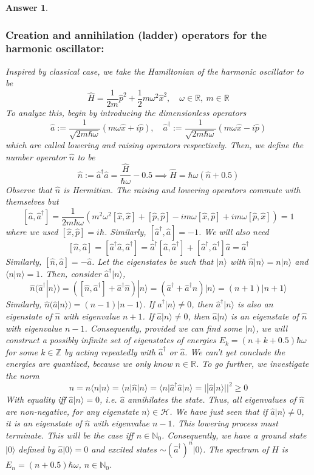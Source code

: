\documentclass[a4paper]{article}
\newtheorem{ans}{Answer}[subsection]
\theoremstyle{new}
\begin{document}
\begin{ans}
\subsubsection*{Creation and annihilation (ladder) operators for the harmonic oscillator:}
Inspired by classical case, we take the Hamiltonian of the harmonic oscillator to be
$$\hat{H}=\frac{1}{2m}\hat{p}^2+\frac{1}{2}m\omega^2\hat{x}^2,\quad \omega\in\mathbb{R},~m\in\mathbb{R}$$
To analyze this, begin by introducing the dimensionless operators
$$\hat{a}:=\frac{1}{\sqrt{2m\hbar\omega}}(m\omega\hat{x}+i\hat{p}),\quad\hat{a}^\dag:=\frac{1}{\sqrt{2m\hbar\omega}}(m\omega\hat{x}-i\hat{p})$$
which are called lowering and raising operators respectively. Then, we define the number operator $\hat{n}$ to be
$$\hat{n}:=\hat{a}^\dag\hat{a}=\frac{\hat{H}}{\hbar\omega}-0.5\implies\hat{H}=\hbar\omega(\hat{n}+0.5)$$
Observe that $\hat{n}$ is Hermitian. The raising and lowering operators commute with themselves but 
$$[\hat{a},\hat{a}^\dag]=\frac{1}{2m\hbar\omega}(m^2\omega^2[\hat{x},\hat{x}]+[\hat{p},\hat{p}]-im\omega[\hat{x},\hat{p}]+im\omega[\hat{p},\hat{x}])=1$$
where we used $[\hat{x},\hat{p}]=i\hbar$. Similarly, $[\hat{a}^\dag,\hat{a}]=-1$. We will also need $$[\hat{n},\hat{a}]=[\hat{a}^\dag\hat{a},\hat{a}^\dag]=\hat{a}^\dag[\hat{a},\hat{a}^\dag]+[\hat{a}^\dag,\hat{a}^\dag]\hat{a}=\hat{a}^\dag$$
Similarly, $[\hat{n},\hat{a}]=-\hat{a}$. Let the eigenstates be such that $|n\rangle$ with $\hat{n}|n\rangle=n|n\rangle$ and $\langle n|n\rangle=1$. Then, consider $\hat{a}^\dag|n\rangle$,
$$\hat{n}(\hat{a}^\dag|n\rangle)=([\hat{n},\hat{a}^\dag]+\hat{a}^\dag\hat{n})|n\rangle=(\hat{a}^\dag+\hat{a}^\dag\hat{n})|n\rangle=(n+1)|n+1\rangle$$
Similarly, $\hat{n}(\hat{a}|n\rangle)=(n-1)|n-1\rangle$. If $\hat{a}^\dag|n\rangle\neq0$, then $\hat{a}^\dag|n\rangle$ is also an eigenstate of $\hat{n}$ with eigenvalue $n+1$. If $\hat{a}|n\rangle\neq0$, then $\hat{a}|n\rangle$ is an eigenstate of $\hat{n}$ with eigenvalue $n-1$. Consequently, provided we can find some $|n\rangle$, we will construct a possibly infinite set of eigenstates of energies $E_k=(n+k+0.5)\hbar\omega$ for some $k\in\mathbb{Z}$ by acting repeatedly with $\hat{a}^\dag$ or $\hat{a}$. We can't yet conclude the energies are quantized, because we only know $n\in\mathbb{R}$. To go further, we investigate the norm
$$n=n\langle n|n\rangle=\langle n|\hat{n}|n\rangle=\langle n|\hat{a}^\dag\hat{a}|n\rangle=||\hat{a}|n\rangle||^2\geq0$$
With equality iff $\hat{a}|n\rangle=0$, i.e. $\hat{a}$ annihilates the state. Thus, all eigenvalues of $\hat{n}$ are non-negative, for any eigenstate $n\rangle\in\mathcal{H}$. We have just seen that if $\hat{a}|n\rangle\neq0$, it is an eigenstate of $\hat{n}$ with eigenvalue $n-1$. This lowering process must terminate. This will be the case iff $n\in\mathbb{N}_0$. Consequently, we have a ground state $|0\rangle$ defined by $\hat{a}|0\rangle=0$ and excited states $\sim(\hat{a}^\dag)^n|0\rangle$. The spectrum of $H$ is $E_n=(n+0.5)\hbar\omega$, $n\in\mathbb{N}_0$.\\[5pt]

\end{ans}
\end{document}
